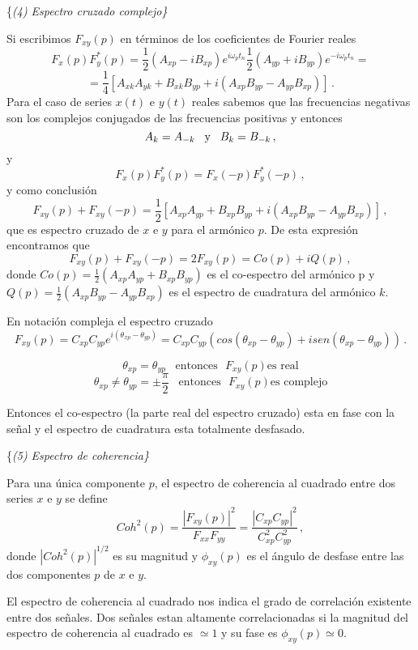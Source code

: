 \documentclass[
]{agujournal2019}
\begin{document}
\vspace{0.5cm}

\{\it \textbf \noindent (4) \noindent Espectro cruzado complejo\}

Si escribimos \(F_{xy}(p)\) en términos de los coeficientes de Fourier
reales
\[F_x(p) F^*_y(p)=\frac{1}{2}\left(A_{xp} - iB_{xp} \right)e^{i\omega_p t_n}\frac{1}{2}\left(A_{yp} + iB_{yp} \right)e^{-i\omega_p t_n}=\]
\[=\frac{1}{4}\left[A_{xk}A_{yk}  + B_{xk}B_{yp} + i\left(A_{xp}B_{yp} - A_{yp}B_{xp}\right)\right]\,.\]
Para el caso de series \(x(t)\) e \(y(t)\) reales sabemos que las
frecuencias negativas son los complejos conjugados de las frecuencias
positivas y entonces
\[A_k=A_{-k}\,\,\,\,\,{\rm y}\,\,\,\,\,B_k=B_{-k}\,,\] y
\[F_x(p)F^*_y(p)=F_x(-p)F_y^*(-p)\,,\] y como conclusión
\[F_{xy}(p)+F_{xy}(-p)=\frac{1}{2}\left[ A_{xp}A_{yp}  + B_{xp}B_{yp} + i\left(A_{xp}B_{yp} - A_{yp}B_{xp}\right)\right]\,,\]
que es espectro cruzado de \(x\) e \(y\) para el armónico \(p\). De esta
expresión encontramos que
\[F_{xy}(p)+F_{xy}(-p)=2F_{xy}(p)=Co(p) + i Q(p)\,,\] donde
\(Co(p)=\frac{1}{2}( A_{xp}A_{yp} + B_{xp}B_{yp})\) es el co-espectro
del armónico p y \(Q(p)=\frac{1}{2}(A_{xp}B_{yp} - A_{yp}B_{xp})\) es el
espectro de cuadratura del armónico \(k\).

En notación compleja el espectro cruzado
\[F_{xy}(p)=C_{xp}C_{yp}e^{i(\theta_{xp}-\theta_{yp})}=C_{xp}C_{yp}\left(cos(\theta_{xp}-\theta_{yp})+ isen(\theta_{xp}-\theta_{yp}) \right)\,.\]

\[\theta_{xp}=\theta_{yp}\,\,\,\,\,\text{entonces}\,\,\,\,F_{xy}(p) \text{es real}\]
\[\theta_{xp}\ne\theta_{yp}=\pm\frac{\pi}{2}\,\,\,\,\,\text{entonces}\,\,\,\,F_{xy}(p) \text{es complejo}\]

Entonces el co-espectro (la parte real del espectro cruzado) esta en
fase con la señal y el espectro de cuadratura esta totalmente desfasado.

\vspace{0.5cm}

\{\it \textbf \noindent (5) Espectro de coherencia\}

Para una única componente \(p\), el espectro de coherencia al cuadrado
entre dos series \(x\) e \(y\) se define
\[Coh^2(p)=\frac{|F_{xy}(p)|^2}{F_{xx}F_{yy}}=\frac{|C_{xp}C_{yp}|^2}{C_{xp}^2C_{yp}^2}\,,\]
donde \(|Coh^2(p)|^{1/2}\) es su magnitud y \(\phi_{xy}(p)\) es el
ángulo de desfase entre las dos componentes \(p\) de \(x\) e \(y\).

El espectro de coherencia al cuadrado nos indica el grado de correlación
existente entre dos señales. Dos señales estan altamente correlacionadas
si la magnitud del espectro de coherencia al cuadrado es \(\simeq 1\) y
su fase es \(\phi_{xy}(p)\simeq 0\).
\end{document}

